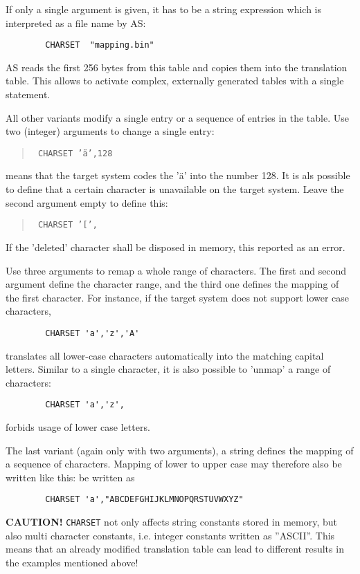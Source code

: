 \documentclass[12pt,twoside]{report}
\newcommand{\bb}[1]{{\bf #1}}
\newcommand{\tty}[1]{{\tt #1}}
\newcommand{\asname}{{AS}}
\begin{document}
If only a single argument is given, it has to be a string expression which is
interpreted as a file name by \asname{}:
\begin{verbatim}
        CHARSET  "mapping.bin"
\end{verbatim}
\asname{} reads the first 256 bytes from this table and copies them into the translation
table.  This allows to activate complex, externally generated tables with a single
statement.

All other variants modify a single entry or a sequence of entries in the
table.  Use two (integer) arguments to change a single entry:
\begin{quote}{\tt
       CHARSET  '\"a',128
}\end{quote}
means that the target system codes the '\"a'  into the number 128.  It is
als possible to define that a certain character is unavailable on the target
system.  Leave the second argument empty to define this:
\begin{quote}{\tt
        CHARSET '[',
}\end{quote}
If the 'deleted' character shall be disposed in memory, this reported as
an error.

Use three arguments to remap a whole range of characters.  The first and
second argument define the character range, and the third one defines
the mapping of the first character.  For instance, if the target system
does not support lower case characters,
\begin{verbatim}
        CHARSET 'a','z','A'
\end{verbatim}
translates all lower-case characters automatically into the matching
capital letters.  Similar to a single character, it is also possible to
'unmap' a range of characters:
\begin{verbatim}
        CHARSET 'a','z',
\end{verbatim}
forbids usage of lower case letters.

The last variant (again only with two arguments), a string defines the
mapping of a sequence of characters.  Mapping of lower to upper case may
therefore also be written like this:
be written as
\begin{verbatim}
        CHARSET 'a',"ABCDEFGHIJKLMNOPQRSTUVWXYZ"
\end{verbatim}

\bb{CAUTION!} \tty{CHARSET} not only affects string constants stored in
memory, but also multi character constants, i.e. integer constants written
as ''ASCII''.  This means that an already modified translation table can
lead to different results in the examples mentioned above!
\end{document}
